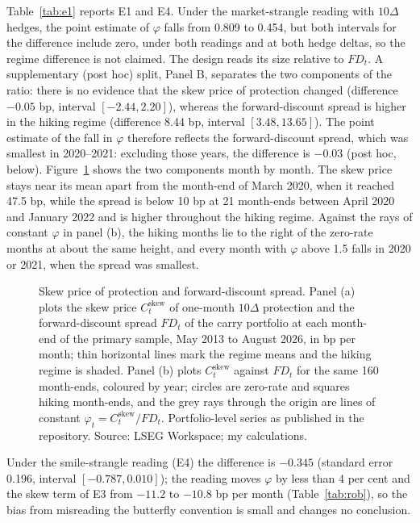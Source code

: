 \documentclass[11pt]{article}
\theoremstyle{result}
\newcommand{\FD}{\mathit{FD}}
\newcommand{\Cskew}{C^{\mathrm{skew}}}
\newcommand{\D}{\Delta}
\begin{document}
Table~\ref{tab:e1} reports E1 and E4. Under the market-strangle reading with $10\D$ hedges, the point estimate of $\varphi$ falls from 0.809 to 0.454, but both intervals for the difference include zero, under both readings and at both hedge deltas, so the regime difference is not claimed. The design reads its size relative to $\FD_t$. A supplementary (post hoc) split, Panel B, separates the two components of the ratio: there is no evidence that the skew price of protection changed (difference $-0.05$ bp, interval $[-2.44,2.20]$), whereas the forward-discount spread is higher in the hiking regime (difference 8.44 bp, interval $[3.48,13.65]$). The point estimate of the fall in $\varphi$ therefore reflects the forward-discount spread, which was smallest in 2020--2021: excluding those years, the difference is $-0.03$ (post hoc, below). Figure~\ref{fig:e1} shows the two components month by month. The skew price stays near its mean apart from the month-end of March 2020, when it reached 47.5 bp, while the spread is below 10 bp at 21 month-ends between April 2020 and January 2022 and is higher throughout the hiking regime. Against the rays of constant $\varphi$ in panel (b), the hiking months lie to the right of the zero-rate months at about the same height, and every month with $\varphi$ above 1.5 falls in 2020 or 2021, when the spread was smallest.

\begin{figure}[t]
\centering

\caption{Skew price of protection and forward-discount spread. Panel (a) plots the skew price $\Cskew_t$ of one-month $10\D$ protection and the forward-discount spread $\FD_t$ of the carry portfolio at each month-end of the primary sample, May 2013 to August 2026, in bp per month; thin horizontal lines mark the regime means and the hiking regime is shaded. Panel (b) plots $\Cskew_t$ against $\FD_t$ for the same 160 month-ends, coloured by year; circles are zero-rate and squares hiking month-ends, and the grey rays through the origin are lines of constant $\varphi_t=\Cskew_t/\FD_t$. Portfolio-level series as published in the repository. Source: LSEG Workspace; my calculations.}\label{fig:e1}
\end{figure}

Under the smile-strangle reading (E4) the difference is $-0.345$ (standard error 0.196, interval $[-0.787,0.010]$); the reading moves $\varphi$ by less than 4 per cent and the skew term of E3 from $-11.2$ to $-10.8$ bp per month (Table~\ref{tab:rob}), so the bias from misreading the butterfly convention is small and changes no conclusion.
\end{document}
